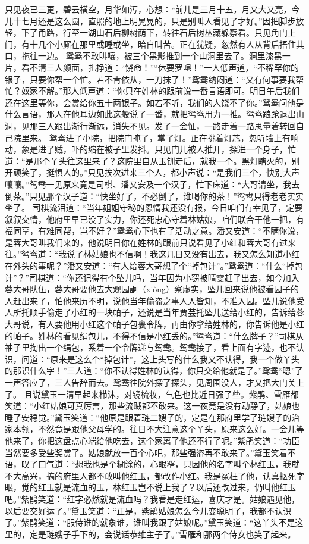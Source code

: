 \documentclass[12pt,oneside]{book}
\begin{document}
只见夜已三更，碧云横空，月华如泻，心想：“前儿是三月十五，月又大又亮，今儿十七月还是这么圆，直照的地上明晃晃的，只是别叫人看见了才好。”因把脚步放轻，下了甬路，行至一湖山石后柳树荫下，转往石后树丛藏躲察看。只见角门上闩，有十几个小厮在那里或睡或坐，暗自叫苦。正在犹疑，忽然有人从背后捂住其口，拖往一边。
鸳鸯不敢叫嚷，被三个黑影推到一个山洞里去了。洞里漆黑一片，看不清三人颜面，扎挣道：“饶命！”“休要罗唣！”一人低声道，“不稀罕你的银子，只要你帮一个忙。若不肯依从，一刀抹了！”鸳鸯纳闷道：“又有何事要我帮忙？奴家不解。”那人低声道：“你只在姓林的跟前说一番言语即可。明日午后我们还在这里等你，会赏给你五十两银子。如若不听，我们的人饶不了你。”鸳鸯问他是什么言语，那人在他耳边如此这般说了一番，就把鸳鸯用力一推。鸳鸯踉跄退出山洞，见那三人跟出渐行渐远，消失不见。发了一会怔，一路走着一路思量着转回自己院里来。
鸳鸯进了小院，把院门掩了，掌了灯。正在挑着灯芯，忽听墙上有响动，象是进了贼，吓的缩在被子里发抖。只见门儿被人推开，探进一个身子，忙道：“是那个丫头往这里来了？这院里自从玉钏走后，就我一个。黑灯瞎火的，别开顽笑了，挺惧人的。”只见挨次进来三个人，都小声说：“是我们三个，快别大声嚷嚷。”鸳鸯一见原来竟是司棋、潘又安及一个汉子，忙下床道：“大哥请坐，我去倒茶。”只见那个汉子道：“快坐好了，不必倒了，谁喝你的茶！”鸳鸯只得老老实实坐了。
司棋流泪道：“当年姐姐守秘的恩情我还没有报，今日咱们有幸见了，定要叙叙交情，他府里早已没了实力，你还死忠心守着林姑娘，咱们联合干他一把，有福同享，有难同帮，岂不好？”鸳鸯心下也有了活动之意。潘又安道：“不瞒你说，是蓉大哥叫我们来的，他说明日你在姓林的跟前只说看见了小红和蓉大哥有过来往。”鸳鸯道：“我说了林姑娘也不信啊！我这几日又没有出去，我又怎么知道小红在外头的事呢？”潘又安道：“有人给蓉大哥想了个“掉包计”。”鸳鸯道：“什么“掉包计”？”司棋道：“你还记得有个坠儿吗，当年因为小窃被晴雯赶了出去，如今加入蓉大哥队伍，蓉大哥要他去大观园詗（xiòng）察虚实，坠儿回来说他被看园子的人赶出来了，怕他来历不明，说他当年偷盗之事人人皆知，不准入园。坠儿说他受人所托顺手偷走了小红的一块帕子，还说是当年贾芸托坠儿送给小红的，告诉给蓉大哥说，有人要他用小红这个帕子包裹令牌，再由你拿给姓林的，你告诉他是小红的帕子。姓林的看见绢包儿，不得不信是小红丢的。”鸳鸯道：“什么牌子？”司棋从袖子里掏出一个绢包，系着一个令牌递与鸳鸯。鸳鸯接了，看上面有字迹，也不认识，问道：“原来是这么个“掉包计”，这上头写的什么我又不认得，我一个做丫头的那识什么字！”三人道：“你不认得姓林的认得，你只交给他就是了。”鸳鸯“嗯”了一声答应了，三人告辞而去。鸳鸯往院外探了探头，见周围没人，才又把大门关上了。
且说黛玉一清早起来栉沐，对镜梳妆，气色也比近日强了些。紫鹃、雪雁都笑道：“小红姑娘可真厉害，那些流贼都不敢来。这一夜竟是没有动静了，姑娘也睡了安稳觉。”黛玉笑道：“他原是跟着琏二嫂子的，定是在那府里学了琏嫂子的治家本领，不然竟是跟他父母学的。往日不大注意这个丫头，原来这么好。一会儿等他来了，你把这盘点心端给他吃去，这个家离了他还不行了呢。”紫鹃笑道：“功臣当然要多受些奖赏了。姑娘就放一百个心吧，那些强盗再不敢来了。”黛玉笑着不语，叹了口气道：“想我也是个糊涂的，心眼窄，只因他的名字叫个林红玉，我就不大高兴，搞的府里人都不敢叫他红玉，都改作小红。我是冤枉了他，认真抠死字眼，觉的红玉就是流血的玉，林红玉岂不说上我了？以后还改过来，仍叫他红玉吧。”紫鹃笑道：“红字必然就是流血吗？我看是走红运，喜庆才是。姑娘遇见他，以后要交好运了。”黛玉笑道：“正是，紫鹃姑娘怎么今儿变聪明了，我都不认识了。”紫鹃笑道：“服侍谁的就象谁，谁叫我跟了姑娘呢。”黛玉笑道：“这丫头不是这里的，定是琏嫂子手下的，会说话恭维主子了。”雪雁和那两个侍女也笑了起来。
\end{document}
